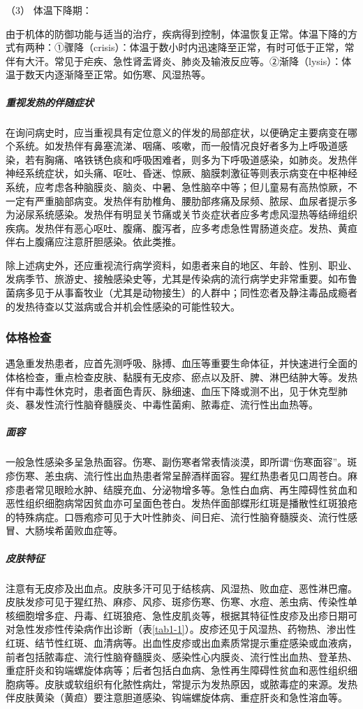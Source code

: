 \hypertarget{text00008.htmlux5cux23CHP1-1-2-1-2-3}{}
（3） 体温下降期：

由于机体的防御功能与适当的治疗，疾病得到控制，体温恢复正常。体温下降的方式有两种：①骤降（crisis）：体温于数小时内迅速降至正常，有时可低于正常，常伴有大汗。常见于疟疾、急性肾盂肾炎、肺炎及输液反应等。②渐降（lysis）：体温于数天内逐渐降至正常。如伤寒、风湿热等。

\subparagraph{重视发热的伴随症状}

在询问病史时，应当重视具有定位意义的伴发的局部症状，以便确定主要病变在哪个系统。如发热伴有鼻塞流涕、咽痛、咳嗽，而一般情况良好者多为上呼吸道感染，若有胸痛、咯铁锈色痰和呼吸困难者，则多为下呼吸道感染，如肺炎。发热伴神经系统症状，如头痛、呕吐、昏迷、惊厥、脑膜刺激征等则表示病变在中枢神经系统，应考虑各种脑膜炎、脑炎、中暑、急性脑卒中等；但儿童易有高热惊厥，不一定有严重脑部病变。发热伴有肋椎角、腰肋部疼痛及尿频、脓尿、血尿者提示多为泌尿系统感染。发热伴有明显关节痛或关节炎症状者应多考虑风湿热等结缔组织疾病。发热伴有恶心呕吐、腹痛、腹泻者，应多考虑急性胃肠道炎症。发热、黄疸伴右上腹痛应注意肝胆感染。依此类推。

除上述病史外，还应重视流行病学资料，如患者来自的地区、年龄、性别、职业、发病季节、旅游史、接触感染史等，尤其是传染病的流行病学史非常重要。如布鲁菌病多见于从事畜牧业（尤其是动物接生）的人群中；同性恋者及静注毒品成瘾者的发热待查以艾滋病或合并机会性感染的可能性较大。

\subsubsection{体格检查}

遇急重发热患者，应首先测呼吸、脉搏、血压等重要生命体征，并快速进行全面的体格检查，重点检查皮肤、黏膜有无皮疹、瘀点以及肝、脾、淋巴结肿大等。发热伴有中毒性休克时，患者面色青灰、脉细速、血压下降或测不出，见于休克型肺炎、暴发性流行性脑脊髓膜炎、中毒性菌痢、脓毒症、流行性出血热等。

\subparagraph{面容}

一般急性感染多呈急热面容。伤寒、副伤寒者常表情淡漠，即所谓“伤寒面容”。斑疹伤寒、恙虫病、流行性出血热患者常呈醉酒样面容。猩红热患者见口周苍白。麻疹患者常见眼睑水肿、结膜充血、分泌物增多等。急性白血病、再生障碍性贫血和恶性组织细胞病常因贫血亦可呈面色苍白。发热伴面部蝶形红斑是播散性红斑狼疮的特殊病症。口唇疱疹可见于大叶性肺炎、间日疟、流行性脑脊髓膜炎、流行性感冒、大肠埃希菌败血症等。

\subparagraph{皮肤特征}

注意有无皮疹及出血点。皮肤多汗可见于结核病、风湿热、败血症、恶性淋巴瘤。皮肤发疹可见于猩红热、麻疹、风疹、斑疹伤寒、伤寒、水痘、恙虫病、传染性单核细胞增多症、丹毒、红斑狼疮、急性皮肌炎等，根据其特征性皮疹及出疹日期可对急性发疹性传染病作出诊断（表\ref{tab1-1}）。皮疹还见于风湿热、药物热、渗出性红斑、结节性红斑、血清病等。出血性皮疹或出血素质常提示重症感染或血液病，前者包括脓毒症、流行性脑脊髓膜炎、感染性心内膜炎、流行性出血热、登革热、重症肝炎和钩端螺旋体病等；后者包括白血病、急性再生障碍性贫血和恶性组织细胞病等。皮肤或软组织有化脓性病灶，常提示为发热原因，或脓毒症的来源。发热伴皮肤黄染（黄疸）要注意胆道感染、钩端螺旋体病、重症肝炎和急性溶血等。

